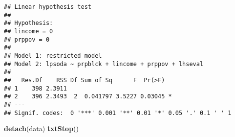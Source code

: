 \documentclass[]{article}
\newenvironment{Shaded}{\begin{snugshade}}{\end{snugshade}}
\newcommand{\KeywordTok}[1]{\textcolor[rgb]{0.13,0.29,0.53}{\textbf{#1}}}
\newcommand{\NormalTok}[1]{#1}
\begin{document}
\begin{verbatim}
## Linear hypothesis test
## 
## Hypothesis:
## lincome = 0
## prppov = 0
## 
## Model 1: restricted model
## Model 2: lpsoda ~ prpblck + lincome + prppov + lhseval
## 
##   Res.Df    RSS Df Sum of Sq      F  Pr(>F)  
## 1    398 2.3911                              
## 2    396 2.3493  2  0.041797 3.5227 0.03045 *
## ---
## Signif. codes:  0 '***' 0.001 '**' 0.01 '*' 0.05 '.' 0.1 ' ' 1
\end{verbatim}

\begin{Shaded}
\begin{Highlighting}[]
\KeywordTok{detach}\NormalTok{(data)}
\KeywordTok{txtStop}\NormalTok{()}
\end{Highlighting}
\end{Shaded}
\end{document}
